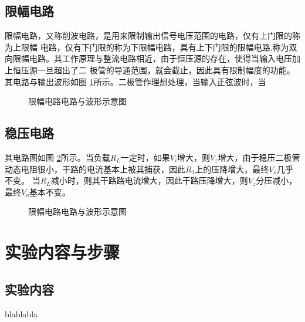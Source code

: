 \documentclass[a4paper,11pt,UTF8]{ctexart}
\begin{document}
\subsection{限幅电路}
限幅电路，又称削波电路，是用来限制输出信号电压范围的电路，仅有上门限的称为上限幅
电路，仅有下门限的称为下限幅电路，具有上下门限的限幅电路,称为双向限幅电路。其工作原理与整流电路相近，由于恒压源的存在，使得当输入电压加上恒压源一旦超出了二
极管的导通范围，就会截止，因此具有限制幅度的功能。其电路与输出波形如图 \ref{fig:limiter}所示。二极管作理想处理，当输入正弦波时，当
\begin{figure}[htbp]
  \centering
  \caption{限幅电路电路与波形示意图}
  \label{fig:limiter}
  \end{figure}

\subsection{稳压电路}
其电路图如图 \ref{fig:stabler}所示。当负载$R_L$一定时，如果$V_i$增大，则$V_z$增大，由于稳压二极管动态电阻很小，干路的电流基本上被其捕获，因此$R_1$上的压降增大，最终$V_o$几乎不变。
当$R_L$减小时，则其干路路电流增大，因此干路压降增大，则$V_z$分压减小，最终$V_o$基本不变。
\begin{figure}[htbp]
  \centering
  \caption{限幅电路电路与波形示意图}
  \label{fig:stabler}
  \end{figure}


\section{实验内容与步骤}
\subsection{实验内容}
	blablabla
\end{document}
